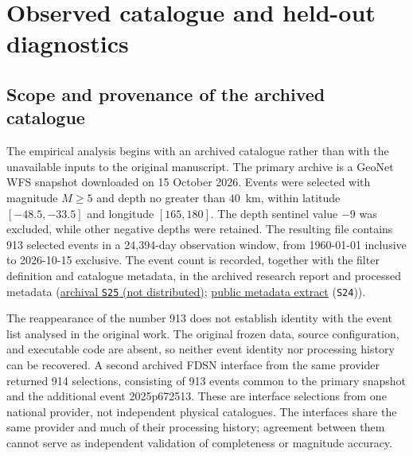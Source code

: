 \chapter{Observed catalogue and held-out diagnostics}
\label{ch:observed}

\section{Scope and provenance of the archived catalogue}

The empirical analysis begins with an archived catalogue rather than with the unavailable inputs to the original manuscript. The primary archive is a GeoNet WFS snapshot downloaded on 15 October 2026. Events were selected with magnitude \(M\geq 5\) and depth no greater than \(40\)~km, within latitude \([-48.5,-33.5]\) and longitude \([165,180]\). The depth sentinel value \(-9\) was excluded, while other negative depths were retained. The resulting file contains 913 selected events in a 24,394-day observation window, from 1960-01-01 inclusive to 2026-10-15 exclusive. The event count is recorded, together with the filter definition and catalogue metadata, in the archived research report and processed metadata (\hyperlink{S25}{archival \texttt{S25} (not distributed)}; \href{https://github.com/Drefetr/InhibitoryEarthquakeModels/blob/3e76a174cf4f58ce601c6c9640c4d0c11168813f/provenance/catalogue_snapshot_metadata.json}{public metadata extract} (\texttt{S24})).

The reappearance of the number 913 does not establish identity with the event list analysed in the original work. The original frozen data, source configuration, and executable code are absent, so neither event identity nor processing history can be recovered. A second archived FDSN interface from the same provider returned 914 selections, consisting of 913 events common to the primary snapshot and the additional event 2025p672513. These are interface selections from one national provider, not independent physical catalogues. The interfaces share the same provider and much of their processing history; agreement between them cannot serve as independent validation of completeness or magnitude accuracy.

